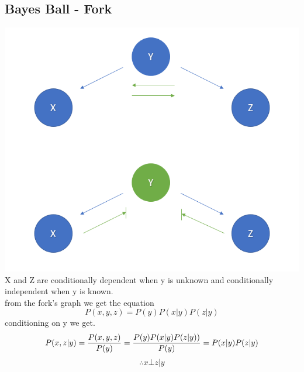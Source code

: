 \documentclass{article}
\begin{document}
\subsection{Bayes Ball - Fork}
\includegraphics[scale=0.7]{Screenshot_8.png}\\
X and Z are conditionally dependent when y is unknown and conditionally independent when y is known.\\
from the fork's graph we get the equation\\
$$P(x, y, z) = P(y)P(x|y)P(z|y)$$
conditioning on y we get.
$$
P(x, z | y) = \frac{P(x, y, z)}{P(y)} \\
= \frac{P(y)P(x|y)P(z|y))}{P(y)} \\
= P(x | y) P(z | y) \\ 
$$
$$\therefore  x \bot z | y$$
\end{document}

